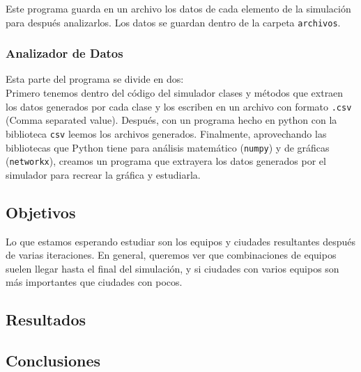 {{        Este programa guarda en un archivo los datos de cada elemento de la
        simulación para después analizarlos. Los datos se guardan dentro de la
        carpeta \texttt{archivos}.
    }
    \subsubsection*{Analizador de Datos}{
        Esta parte del programa se divide en dos: \\
        Primero tenemos dentro del código del simulador clases y métodos que
        extraen los datos generados por cada clase y los escriben en un archivo
        con formato \texttt{.csv} (Comma separated value). Después, con un
        programa hecho en python con la biblioteca \texttt{csv} leemos los
        archivos generados. Finalmente, aprovechando las bibliotecas que Python
        tiene para análisis matemático (\texttt{numpy}) y de gráficas
        (\texttt{networkx}), creamos un programa que extrayera los datos
        generados por el simulador para recrear la gráfica y estudiarla.
    }
}
\subsection*{Objetivos}{Lo que estamos esperando estudiar son los equipos
    y ciudades resultantes después de varias iteraciones. En general, queremos ver
    que combinaciones de equipos suelen llegar hasta el final del simulación, y si
    ciudades con varios equipos son más importantes que ciudades con pocos.
}

\subsection*{Resultados}{}
\subsection*{Conclusiones}{}




